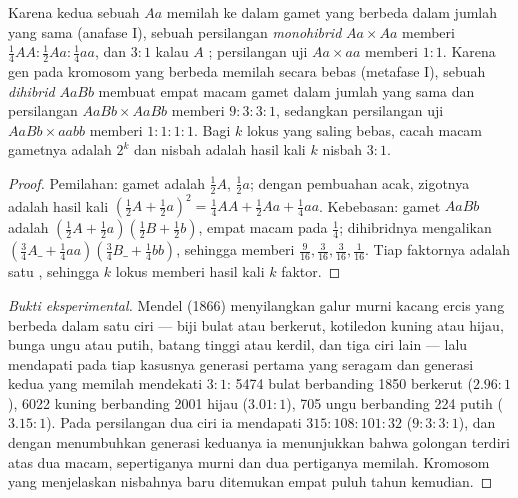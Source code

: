 \begin{theorem}\label{thm:b2:meiosis-heredity:mendel}
Karena kedua  sebuah  $Aa$ memilah ke dalam gamet yang
berbeda dalam jumlah yang sama (anafase I), sebuah persilangan
\emph{monohibrid} $Aa \times Aa$ memberi
 $\tfrac14 AA : \tfrac12 Aa :
\tfrac14 aa$, dan  $3 : 1$ kalau $A$ ; persilangan uji
$Aa \times aa$ memberi $1 : 1$. Karena  gen pada kromosom yang
berbeda memilah secara bebas (metafase I), sebuah \emph{dihibrid}
$AaBb$ membuat empat macam gamet dalam jumlah yang sama dan
persilangan $AaBb \times AaBb$ memberi  $9 : 3 : 3 : 1$,
sedangkan persilangan uji $AaBb \times aabb$ memberi $1 : 1 : 1 : 1$.
Bagi $k$ lokus  yang saling bebas, cacah macam gametnya
adalah $2^k$ dan nisbah  adalah hasil kali $k$ nisbah
$3 : 1$.
\end{theorem}
\begin{proof}
Pemilahan: gamet  adalah $\tfrac12 A$,
$\tfrac12 a$; dengan pembuahan acak,  zigotnya adalah hasil
kali $(\tfrac12 A + \tfrac12 a)^2 = \tfrac14 AA + \tfrac12 Aa +
\tfrac14 aa$. Kebebasan: gamet $AaBb$ adalah $(\tfrac12 A
+ \tfrac12 a)(\tfrac12 B + \tfrac12 b)$, empat macam pada $\tfrac14$;
 dihibridnya mengalikan $(\tfrac34 A\_ + \tfrac14 aa)
(\tfrac34 B\_ + \tfrac14 bb)$, sehingga memberi
$\tfrac{9}{16}, \tfrac{3}{16},
\tfrac{3}{16}, \tfrac{1}{16}$. Tiap faktornya adalah
satu , sehingga $k$ lokus memberi hasil kali $k$ faktor.
\end{proof}
\begin{proof}[Bukti eksperimental]
Mendel (1866) menyilangkan galur murni kacang ercis yang berbeda dalam
satu ciri --- biji bulat atau berkerut, kotiledon kuning atau hijau,
bunga ungu atau putih, batang tinggi atau kerdil, dan tiga ciri lain
--- lalu mendapati pada tiap kasusnya generasi pertama yang seragam dan
generasi kedua yang memilah mendekati $3 : 1$: 5474 bulat berbanding
1850 berkerut ($2.96 :
1$), 6022 kuning berbanding 2001 hijau ($3.01 : 1$), 705 ungu
berbanding 224 putih ($3.15 : 1$). Pada persilangan dua ciri ia
mendapati $315 : 108 : 101 :
32$ ($9 : 3 : 3 : 1$), dan dengan menumbuhkan generasi keduanya ia
menunjukkan bahwa golongan  terdiri atas dua macam,
sepertiganya murni dan dua pertiganya memilah. Kromosom yang
menjelaskan nisbahnya baru ditemukan empat puluh tahun kemudian.
\end{proof}

